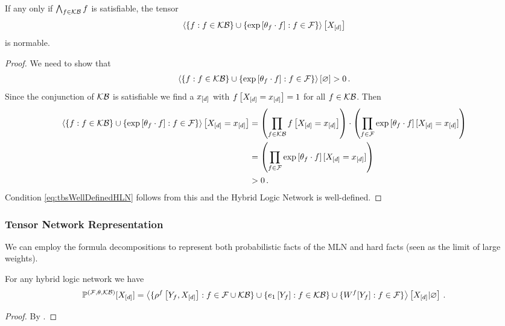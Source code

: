 \begin{theorem}
	If any only if $\bigwedge_{f\in\mathcal{KB}}f$ is satisfiable, the tensor 
		\[  \left\langle 
		\{f : f\in\mathcal{KB}\} \cup \{\mathrm{exp}\left[\theta_{f}\cdot f\right] : f\in\mathcal{F}\}
		\right\rangle \left[ X_{[d]} \right] \]
	is normable.
\end{theorem}
\begin{proof}
	We need to show that
	\begin{align}\label{eq:tbsWellDefinedHLN}
		\left\langle \{f : f\in\mathcal{KB}\} \cup \{\mathrm{exp}\left[\theta_{f}\cdot f\right] : f\in\mathcal{F}\}\right\rangle \left[ \varnothing \right] > 0 \, . 
	\end{align}
	Since the conjunction of $\mathcal{KB}$ is satisfiable we find a $x_{[d]}$ with $f\left[X_{[d]}=x_{[d]}\right]=1$ for all $f\in\mathcal{KB}$.
	Then 
	\begin{align*}
		 \left\langle \{f : f\in\mathcal{KB}\} \cup \{\mathrm{exp}\left[\theta_{f}\cdot f\right] : f\in\mathcal{F}\}\right\rangle \left[ X_{[d]}=x_{[d]} \right]  
		 & = \left( \prod_{f\in\mathcal{KB}}f\left[X_{[d]}=x_{[d]}\right] \right) 
		 \cdot \left( \prod_{f\in\mathcal{F}}\mathrm{exp}\left[\theta_{f}\cdot f\right][X_{[d]}=x_{[d]}] \right) \\
		 & =  \left( \prod_{f\in\mathcal{F}}\mathrm{exp}\left[\theta_{f}\cdot f\right][X_{[d]}=x_{[d]}] \right) \\
		 & > 0 \, . 
	\end{align*}
	Condition \eqref{eq:tbsWellDefinedHLN} follows from this and the Hybrid Logic Network is well-defined.
\end{proof}


\subsubsection{Tensor Network Representation}

We can employ the formula decompositions to represent both probabilistic facts of the MLN and hard facts (seen as the limit of large weights).

\begin{theorem}\label{the:hybridNetworkRepresentation}
	For any hybrid logic network we have
	\begin{align*}
		\mathbb{P}^{(\mathcal{F},\theta,\mathcal{KB})}[X_{[d]}] 
		= \left\langle 
		\{\rho^{f}\left[Y_{f},X_{[d]}\right] : f\in\mathcal{F}\cup\mathcal{KB} \}
		\cup \{e_1\left[Y_{f}\right] : f\in\mathcal{KB} \}
		\cup \{W^{f}[Y_{f}] : f\in\mathcal{F} \}
		\right\rangle \left[ X_{[d]} | \varnothing \right] \, . 
	\end{align*}
\end{theorem}
\begin{proof}
	By .
\end{proof}

